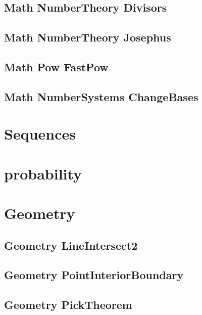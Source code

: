 \subsection{Math NumberTheory Divisors}
\raggedbottom
\hrulefill
\subsection{Math NumberTheory Josephus}
\raggedbottom
\hrulefill
\subsection{Math Pow FastPow}
\raggedbottom
\hrulefill
\subsection{Math NumberSystems ChangeBases}
\raggedbottom
\hrulefill

\section{Sequences}

\section{probability}

\section{Geometry}
\subsection{Geometry LineIntersect2}
\raggedbottom
\hrulefill
\subsection{Geometry PointInteriorBoundary}
\raggedbottom
\hrulefill
\subsection{Geometry PickTheorem}
\raggedbottom
\hrulefill
